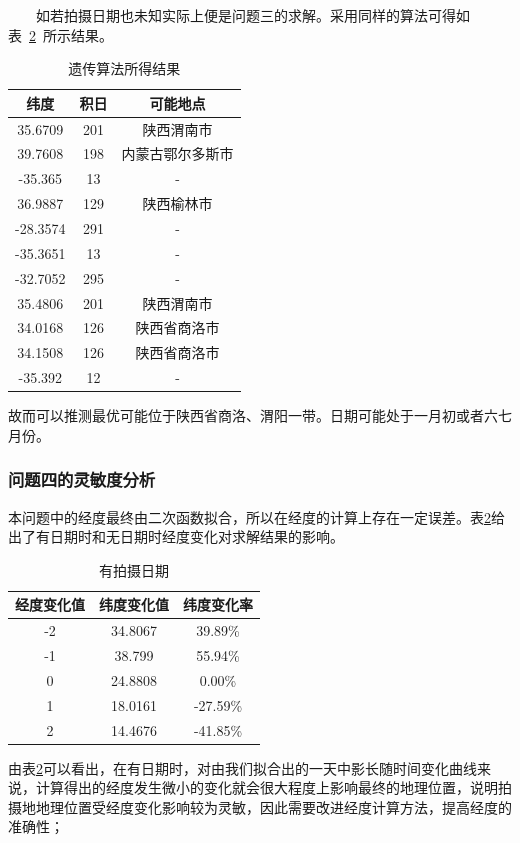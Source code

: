 \documentclass[12pt]{cumcmart}   %
\begin{document}
$\qquad$如若拍摄日期也未知实际上便是问题三的求解。采用同样的算法可得如表~\ref{answer2}~所示结果。
\begin{table}[H]
	\centering
	\caption{遗传算法所得结果}\label{answer2}
	\begin{tabular}{ccc}
		\toprule[1.5pt]
		纬度&积日&可能地点 \\
		\midrule[1pt]
	35.6709&	201	&陕西渭南市\\
	39.7608&	198	&内蒙古鄂尔多斯市\\
	-35.365&	13	&-\\
	36.9887	&129&	陕西榆林市\\
	-28.3574&	291	&-\\
	-35.3651&	13&	-\\
	-32.7052&	295&	-\\
	35.4806	&201	&陕西渭南市\\
	34.0168	&126	&陕西省商洛市\\
	34.1508&	126&	陕西省商洛市\\
	-35.392	&12&	-\\
		\bottomrule[1.5pt]
	\end{tabular}
\end{table}
故而可以推测最优可能位于陕西省商洛、渭阳一带。日期可能处于一月初或者六七月份。

\subsubsection{问题四的灵敏度分析}
本问题中的经度最终由二次函数拟合，所以在经度的计算上存在一定误差。表\ref{answer2}给出了有日期时和无日期时经度变化对求解结果的影响。

\begin{table}[H]
	\centering
	\caption{有拍摄日期}\label{answer2}
	\begin{tabular}{ccc}
		\toprule[1.5pt]
经度变化值	&纬度变化值&	纬度变化率\\
		\midrule[1pt]

-2	&34.8067&	39.89\%\\
-1&	38.799	&55.94\%\\
0&	24.8808	&0.00\%\\
1&	18.0161	&-27.59\%\\
2&	14.4676	&-41.85\%\\

		\bottomrule[1.5pt]
	\end{tabular}
\end{table}
由表\ref{answer2}可以看出，在有日期时，对由我们拟合出的一天中影长随时间变化曲线来说，计算得出的经度发生微小的变化就会很大程度上影响最终的地理位置，说明拍摄地地理位置受经度变化影响较为灵敏，因此需要改进经度计算方法，提高经度的准确性；
\end{document}
